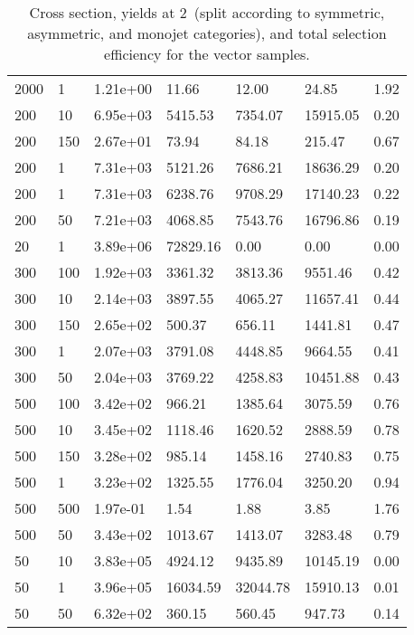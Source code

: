 \begin{table}
\begin{tabular}{lllllll}
2000      &   1         &   1.21e+00  &   11.66     &   12.00     &   24.85     &   1.92      \\ 
200       &   10        &   6.95e+03  &   5415.53   &   7354.07   &   15915.05  &   0.20      \\ 
200       &   150       &   2.67e+01  &   73.94     &   84.18     &   215.47    &   0.67      \\ 
200       &   1         &   7.31e+03  &   5121.26   &   7686.21   &   18636.29  &   0.20      \\ 
200       &   1         &   7.31e+03  &   6238.76   &   9708.29   &   17140.23  &   0.22      \\ 
200       &   50        &   7.21e+03  &   4068.85   &   7543.76   &   16796.86  &   0.19      \\ 
20        &   1         &   3.89e+06  &   72829.16  &   0.00      &   0.00      &   0.00      \\ 
300       &   100       &   1.92e+03  &   3361.32   &   3813.36   &   9551.46   &   0.42      \\ 
300       &   10        &   2.14e+03  &   3897.55   &   4065.27   &   11657.41  &   0.44      \\ 
300       &   150       &   2.65e+02  &   500.37    &   656.11    &   1441.81   &   0.47      \\ 
300       &   1         &   2.07e+03  &   3791.08   &   4448.85   &   9664.55   &   0.41      \\ 
300       &   50        &   2.04e+03  &   3769.22   &   4258.83   &   10451.88  &   0.43      \\ 
500       &   100       &   3.42e+02  &   966.21    &   1385.64   &   3075.59   &   0.76      \\ 
500       &   10        &   3.45e+02  &   1118.46   &   1620.52   &   2888.59   &   0.78      \\ 
500       &   150       &   3.28e+02  &   985.14    &   1458.16   &   2740.83   &   0.75      \\ 
500       &   1         &   3.23e+02  &   1325.55   &   1776.04   &   3250.20   &   0.94      \\ 
500       &   500       &   1.97e-01  &   1.54      &   1.88      &   3.85      &   1.76      \\ 
500       &   50        &   3.43e+02  &   1013.67   &   1413.07   &   3283.48   &   0.79      \\ 
50        &   10        &   3.83e+05  &   4924.12   &   9435.89   &   10145.19  &   0.00      \\ 
50        &   1         &   3.96e+05  &   16034.59  &   32044.78  &   15910.13  &   0.01      \\ 
50        &   50        &   6.32e+02  &   360.15    &   560.45    &   947.73    &   0.14      \\ 
\hline
\end{tabular}
\caption{Cross section, yields at 2~\ifb (split according to symmetric, asymmetric, and monojet categories), and total selection efficiency for the vector \DMj samples.}
\label{summaryTableAN_DMV_xs10_g0p25_2p1fb_exp}
\end{table}
